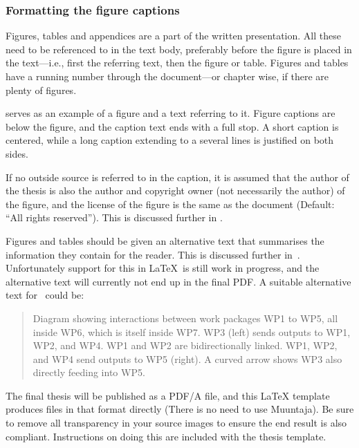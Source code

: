 \subsubsection{Formatting the figure captions}
Figures, tables and appendices are a part of the written
presentation. All these need to be referenced to in the text body,
preferably before the figure is placed in the text---i.e., first the
referring text, then the figure or table. Figures and tables have a
running number through the document---or chapter wise, if there are
plenty of figures.

 serves as an example of a figure and a text
referring to it. Figure captions are below the figure, and the caption
text ends with a full stop. A short caption is centered, while a long
caption extending to a several lines is justified on both sides. 

If no outside source is referred to in the caption, it is assumed that
the author of the thesis is also the author and copyright owner (not necessarily the author) of the figure, and the license of the figure is the same as the document (Default: ``All rights reserved''). This is discussed further in .

Figures and tables should be given an alternative text that summarises
the information they contain for the reader. This is discussed further
in~. Unfortunately support for this in
\LaTeX\ is still work in progress, and the alternative text will
currently not end up in the final PDF. A suitable alternative text
for~ could be:

\begin{quote}
  Diagram showing interactions between work packages WP1 to WP5, all inside WP6, which is itself inside WP7. WP3 (left) sends outputs to WP1, WP2, and WP4. WP1 and WP2 are bidirectionally linked. WP1, WP2, and WP4 send outputs to WP5 (right). A curved arrow shows WP3 also directly feeding into WP5.
\end{quote} 

The final thesis will be published as a PDF/A file, and this LaTeX
template produces files in that format directly (There is no need to
use Muuntaja). Be sure to remove all transparency in your source
images to ensure the end result is also compliant. Instructions on doing this are included with the thesis template.

